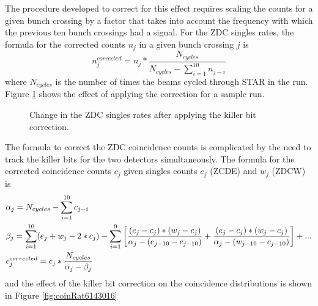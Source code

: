 The procedure developed to correct for this effect requires scaling the counts
for a given bunch crossing by a factor that takes into account the frequency
with which the previous ten bunch crossings had a signal. For the ZDC singles
rates, the formula for the corrected counts $n_{j}$ in a given bunch crossing
$j$ is
%
\begin{equation}
  n_{j}^{corrected} = n_{j} * \frac{N_{cycles}}{N_{cycles} - \sum_{i=1}^{10}n_{j-i}}
\end{equation}
%
where $N_{cycles}$ is the number of times the beams cycled through STAR in the
run. Figure \ref{fig:zdc-singles-ratio} shows the effect of applying the
correction for a sample run.

\begin{figure}
  \caption{Change in the ZDC singles rates after applying the killer bit correction.}
  \label{fig:zdc-singles-ratio}
\end{figure}

The formula to correct the ZDC coincidence counts is complicated by the need
to track the killer bits for the two detectors simultaneously. The formula for
the corrected coincidence counts $c_{j}$ given singles counts $e_{j}$ (ZCDE)
and $w_{j}$ (ZDCW) is
%
\begin{align}
  &\alpha_{j} = N_{cycles} - \sum_{i=1}^{10}c_{j-i} \notag\\
  &\beta_{j} = \sum_{i=1}^{10}(e_{j} + w_{j} - 2*c_{j}) - \sum_{i=1}^{9}\left[\frac{(e_{j}-c_{j}) * (w_{j}-c_{j})}{\alpha_{j}-(e_{j-10}-c_{j-10})} + \frac{(e_{j}-c_{j}) * (w_{j}-c_{j})}{\alpha_{j}-(w_{j-10}-c_{j-10})}\right] + ... \notag\\
  &c_{j}^{corrected} = c_{j} * \frac{N_{cycles}}{\alpha_{j} - \beta_{j}} 
\end{align}
%
and the effect of the killer bit correction on the coincidence distributions
is shown in Figure \ref{fig:coinRat6143016}

